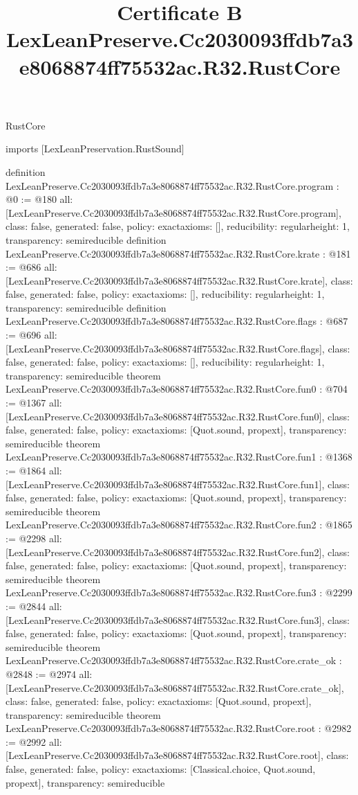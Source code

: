 \begin{lexlean}{RustCore}
\title{Certificate B LexLeanPreserve.Cc2030093ffdb7a3e8068874ff75532ac.R32.RustCore}
\begin{coremodule}
imports [LexLeanPreservation.RustSound]

definition LexLeanPreserve.Cc2030093ffdb7a3e8068874ff75532ac.R32.RustCore.program : @0 := @180 {
  all: [LexLeanPreserve.Cc2030093ffdb7a3e8068874ff75532ac.R32.RustCore.program],
  class: false,
  generated: false,
  policy: exact{axioms: []},
  reducibility: regular{height: 1},
  transparency: semireducible
}
definition LexLeanPreserve.Cc2030093ffdb7a3e8068874ff75532ac.R32.RustCore.krate : @181 := @686 {
  all: [LexLeanPreserve.Cc2030093ffdb7a3e8068874ff75532ac.R32.RustCore.krate],
  class: false,
  generated: false,
  policy: exact{axioms: []},
  reducibility: regular{height: 1},
  transparency: semireducible
}
definition LexLeanPreserve.Cc2030093ffdb7a3e8068874ff75532ac.R32.RustCore.flags : @687 := @696 {
  all: [LexLeanPreserve.Cc2030093ffdb7a3e8068874ff75532ac.R32.RustCore.flags],
  class: false,
  generated: false,
  policy: exact{axioms: []},
  reducibility: regular{height: 1},
  transparency: semireducible
}
theorem LexLeanPreserve.Cc2030093ffdb7a3e8068874ff75532ac.R32.RustCore.fun0 : @704 := @1367 {
  all: [LexLeanPreserve.Cc2030093ffdb7a3e8068874ff75532ac.R32.RustCore.fun0],
  class: false,
  generated: false,
  policy: exact{axioms: [Quot.sound, propext]},
  transparency: semireducible
}
theorem LexLeanPreserve.Cc2030093ffdb7a3e8068874ff75532ac.R32.RustCore.fun1 : @1368 := @1864 {
  all: [LexLeanPreserve.Cc2030093ffdb7a3e8068874ff75532ac.R32.RustCore.fun1],
  class: false,
  generated: false,
  policy: exact{axioms: [Quot.sound, propext]},
  transparency: semireducible
}
theorem LexLeanPreserve.Cc2030093ffdb7a3e8068874ff75532ac.R32.RustCore.fun2 : @1865 := @2298 {
  all: [LexLeanPreserve.Cc2030093ffdb7a3e8068874ff75532ac.R32.RustCore.fun2],
  class: false,
  generated: false,
  policy: exact{axioms: [Quot.sound, propext]},
  transparency: semireducible
}
theorem LexLeanPreserve.Cc2030093ffdb7a3e8068874ff75532ac.R32.RustCore.fun3 : @2299 := @2844 {
  all: [LexLeanPreserve.Cc2030093ffdb7a3e8068874ff75532ac.R32.RustCore.fun3],
  class: false,
  generated: false,
  policy: exact{axioms: [Quot.sound, propext]},
  transparency: semireducible
}
theorem LexLeanPreserve.Cc2030093ffdb7a3e8068874ff75532ac.R32.RustCore.crate_ok : @2848 := @2974 {
  all: [LexLeanPreserve.Cc2030093ffdb7a3e8068874ff75532ac.R32.RustCore.crate_ok],
  class: false,
  generated: false,
  policy: exact{axioms: [Quot.sound, propext]},
  transparency: semireducible
}
theorem LexLeanPreserve.Cc2030093ffdb7a3e8068874ff75532ac.R32.RustCore.root : @2982 := @2992 {
  all: [LexLeanPreserve.Cc2030093ffdb7a3e8068874ff75532ac.R32.RustCore.root],
  class: false,
  generated: false,
  policy: exact{axioms: [Classical.choice, Quot.sound, propext]},
  transparency: semireducible
}


\end{coremodule}
\end{lexlean}
